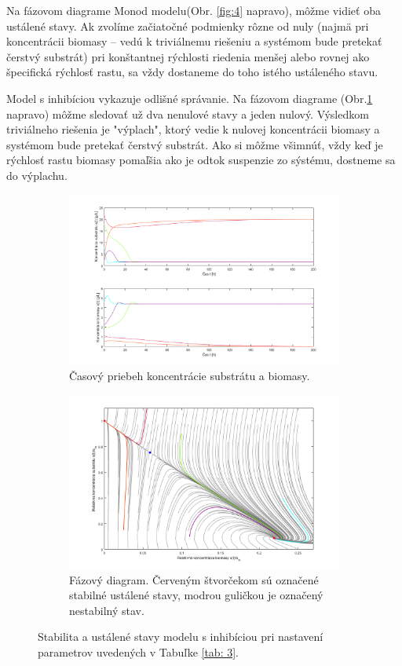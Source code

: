 Na  fázovom diagrame Monod modelu(Obr. \ref{fig:4} napravo), môžme vidieť oba ustálené stavy. Ak zvolíme začiatočné podmienky rôzne od nuly (najmä pri koncentrácii biomasy -- vedú k triviálnemu riešeniu a systémom bude pretekať čerstvý substrát) pri konštantnej rýchlosti riedenia menšej alebo rovnej ako špecifická rýchlosť rastu, sa vždy dostaneme do toho istého ustáleného stavu.

Model s inhibíciou vykazuje odlišné správanie. Na fázovom diagrame (Obr.\ref{fig:5} napravo) môžme sledovať už dva nenulové stavy a jeden nulový. Výsledkom triviálneho riešenia je "výplach", ktorý vedie k nulovej koncentrácii biomasy a systémom bude pretekať čerstvý substrát. Ako si môžme všimnúť, vždy keď je rýchlosť rastu biomasy pomaľšia ako je odtok suspenzie zo sýstému, dostneme sa do výplachu.

\begin{figure}[H]
	\begin{subfigure}{.5\textwidth}
		\centering
		\includegraphics[width=1\linewidth]{images/init_cond_inhb}
		\caption[]{Časový priebeh koncentrácie substrátu a biomasy.}
	\end{subfigure}
	\begin{subfigure}{.5\textwidth}
		\centering
		\includegraphics[width=1\linewidth]{images/phase_inhb}
		\caption[]{Fázový diagram. Červeným štvorčekom sú označené stabilné ustálené stavy, modrou guličkou je označený nestabilný stav.}
	\end{subfigure}
	\caption{Stabilita a ustálené stavy modelu s inhibíciou pri nastavení parametrov uvedených v Tabuľke \ref{tab: 3}.}
	\label{fig:5}
\end{figure}

